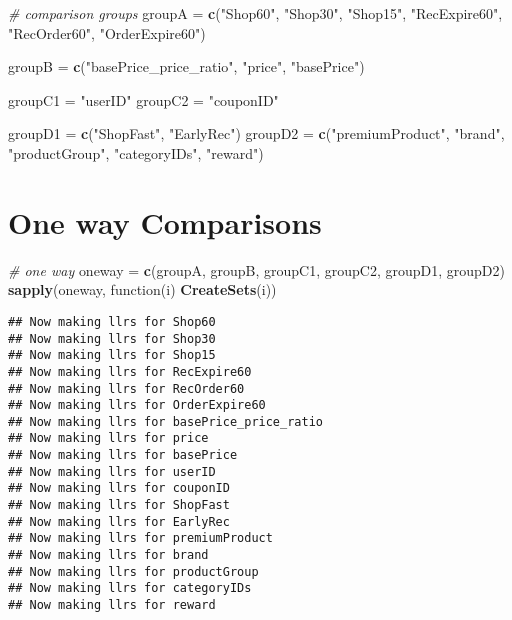 \documentclass[10pt]{report}
\newenvironment{Shaded}{}{}
\newcommand{\KeywordTok}[1]{\textcolor[rgb]{0.00,0.44,0.13}{\textbf{{#1}}}}
\newcommand{\StringTok}[1]{\textcolor[rgb]{0.25,0.44,0.63}{{#1}}}
\newcommand{\CommentTok}[1]{\textcolor[rgb]{0.38,0.63,0.69}{\textit{{#1}}}}
\newcommand{\NormalTok}[1]{{#1}}
\begin{document}
\begin{Shaded}
\begin{Highlighting}[]
\CommentTok{# comparison groups}
\NormalTok{groupA =}\StringTok{ }\KeywordTok{c}\NormalTok{(}\StringTok{"Shop60"}\NormalTok{, }\StringTok{"Shop30"}\NormalTok{, }\StringTok{"Shop15"}\NormalTok{, }\StringTok{"RecExpire60"}\NormalTok{, }\StringTok{"RecOrder60"}\NormalTok{, }\StringTok{"OrderExpire60"}\NormalTok{)}

\NormalTok{groupB =}\StringTok{ }\KeywordTok{c}\NormalTok{(}\StringTok{"basePrice_price_ratio"}\NormalTok{, }\StringTok{"price"}\NormalTok{, }\StringTok{"basePrice"}\NormalTok{)}

\NormalTok{groupC1 =}\StringTok{ "userID"}
\NormalTok{groupC2 =}\StringTok{ "couponID"}

\NormalTok{groupD1 =}\StringTok{ }\KeywordTok{c}\NormalTok{(}\StringTok{"ShopFast"}\NormalTok{, }\StringTok{"EarlyRec"}\NormalTok{)}
\NormalTok{groupD2 =}\StringTok{ }\KeywordTok{c}\NormalTok{(}\StringTok{"premiumProduct"}\NormalTok{, }\StringTok{"brand"}\NormalTok{, }\StringTok{"productGroup"}\NormalTok{, }\StringTok{"categoryIDs"}\NormalTok{, }\StringTok{"reward"}\NormalTok{)}
\end{Highlighting}
\end{Shaded}

\section{One way Comparisons}\label{one-way-comparisons}

\begin{Shaded}
\begin{Highlighting}[]
\CommentTok{# one way}
\NormalTok{oneway =}\StringTok{ }\KeywordTok{c}\NormalTok{(groupA, groupB, groupC1, groupC2, groupD1, groupD2)}
\KeywordTok{sapply}\NormalTok{(oneway, function(i) }\KeywordTok{CreateSets}\NormalTok{(i))}
\end{Highlighting}
\end{Shaded}

\begin{verbatim}
## Now making llrs for Shop60
## Now making llrs for Shop30
## Now making llrs for Shop15
## Now making llrs for RecExpire60
## Now making llrs for RecOrder60
## Now making llrs for OrderExpire60
## Now making llrs for basePrice_price_ratio
## Now making llrs for price
## Now making llrs for basePrice
## Now making llrs for userID
## Now making llrs for couponID
## Now making llrs for ShopFast
## Now making llrs for EarlyRec
## Now making llrs for premiumProduct
## Now making llrs for brand
## Now making llrs for productGroup
## Now making llrs for categoryIDs
## Now making llrs for reward
\end{verbatim}
\end{document}
